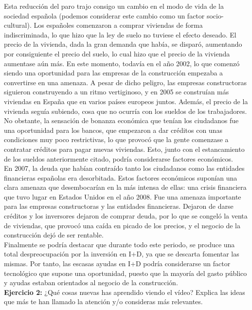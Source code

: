 \documentclass[11pt]{article}
\theoremstyle{plain}
\theoremstyle{definition}
\begin{document}
Esta reducción del paro trajo consigo un cambio en el modo de vida de
la sociedad española (podemos considerar este cambio como un factor
socio-cultural). Los españoles comenzaron a comprar viviendas de forma
indiscriminada, lo que hizo que la ley de suelo no tuviese el efecto
deseado. El precio de la vivienda, dada la gran demanda que había, se
disparó, aumentando por consiguiente el precio del suelo, lo cual hizo
que el precio de la vivienda aumentase aún más. En este momento,
todavía en el año 2002, lo que comenzó siendo una oportunidad para las
empresas de la construcción empezaba a convertirse en una amenaza. A
pesar de dicho peligro, las empresas constructoras siguieron
construyendo a un ritmo vertiginoso, y en 2005 se construían más
viviendas en España que en varios países europeos juntos. Además, el
precio de la vivienda seguía subiendo, cosa que no ocurría con los
sueldos de los trabajadores. No obstante, la sensación de bonanza
económica que tenían los ciudadanos fue una oportunidad para los
bancos, que empezaron a dar créditos con unas condiciones muy poco
restrictivas, lo que provocó que la gente comenzase a contratar
créditos para pagar nuevas viviendas. Esto, junto con el estancamiento 
de los sueldos anteriormente citado, podría considerarse factores 
económicos. \\

En 2007, la deuda que habían contraído tanto los ciudadanos como las
entidades financieras españolas era desorbitada. Estos factores económicos
suponían una clara amenaza que desembocarían en la más intensa de ellas: una
crisis financiera que tuvo lugar en Estados Unidos en el año 2008. Fue
una amenaza importante para las empresas constructoras y las entidades
financieras. Dejaron de darse créditos y los inversores dejaron de
comprar deuda, por lo que se congeló la venta de viviendas, que provocó
una caída en picado de los precios, y el negocio de la construcción
dejó de ser rentable.\\

Finalmente se podría destacar que durante todo este periodo, se produce 
una total despreocupación por la inversión en I+D, ya que se descarta
fomentar las mismas. Por tanto, las escasas ayudas en I+D podría considerarse
un factor tecnológico que supone una oportunidad, puesto que la mayoría del 
gasto público y ayudas estaban orientados al negocio de la construcción.\\



\textbf{Ejercicio 2:} ¿Qué cosas nuevas has aprendido viendo el vídeo?
Explica las ideas que más te han llamado la atención y/o consideras
más relevantes.\\
\end{document}
